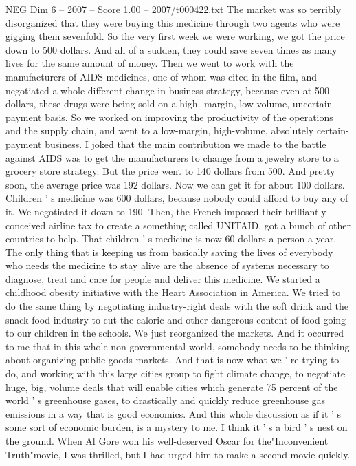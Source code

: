\begin{textsample}{NEG Dim 6 – 2007 – Score 1.00 – 2007/t000422.txt}
The market was so terribly disorganized that they were buying this medicine through two agents who were gigging them sevenfold.
So the very first week we were working, we got the price down to 500 dollars.
And all of a sudden, they could save seven times as many lives for the same amount of money.
Then we went to work with the manufacturers of AIDS medicines, one of whom was cited in the film, and negotiated a whole different change in business strategy, because even at 500 dollars, these drugs were being sold on a high- margin, low-volume, uncertain-payment basis.
So we worked on improving the productivity of the operations and the supply chain, and went to a low-margin, high-volume, absolutely certain-payment business.
I joked that the main contribution we made to the battle against AIDS was to get the manufacturers to change from a jewelry store to a grocery store strategy.
But the price went to 140 dollars from 500.
And pretty soon, the average price was 192 dollars.
Now we can get it for about 100 dollars.
Children ' s medicine was 600 dollars, because nobody could afford to buy any of it.
We negotiated it down to 190.
Then, the French imposed their brilliantly conceived airline tax to create a something called UNITAID, got a bunch of other countries to help.
That children ' s medicine is now 60 dollars a person a year.
The only thing that is keeping us from basically saving the lives of everybody who needs the medicine to stay alive are the absence of systems necessary to diagnose, treat and care for people and deliver this medicine.
We started a childhood obesity initiative with the Heart Association in America.
We tried to do the same thing by negotiating industry-right deals with the soft drink and the snack food industry to cut the caloric and other dangerous content of food going to our children in the schools.
We just reorganized the markets.
And it occurred to me that in this whole non-governmental world, somebody needs to be thinking about organizing public goods markets.
And that is now what we ' re trying to do, and working with this large cities group to fight climate change, to negotiate huge, big, volume deals that will enable cities which generate 75 percent of the world ' s greenhouse gases, to drastically and quickly reduce greenhouse gas emissions in a way that is good economics.
And this whole discussion as if it ' s some sort of economic burden, is a mystery to me.
I think it ' s a bird ' s nest on the ground.
When Al Gore won his well-deserved Oscar for the"Inconvenient Truth"movie, I was thrilled, but I had urged him to make a second movie quickly.

\end{textsample}
